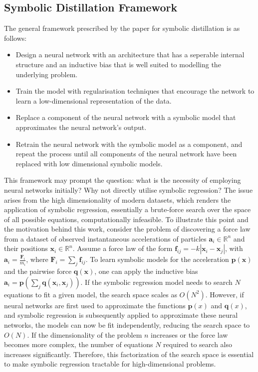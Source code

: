 \documentclass[11pt]{article}
\begin{document}
\subsection{Symbolic Distillation Framework}
The general framework prescribed by the paper for symbolic distillation is as follows:
\begin{itemize}
    \item Design a neural network with an architecture that has a seperable internal structure and an inductive bias that is well suited to modelling the underlying problem.
    \item Train the model with regularisation techniques that encourage the network to learn a low-dimensional representation of the data.
    \item Replace a component of the neural network with a symbolic model that approximates the neural network's output.
    \item Retrain the neural network with the symbolic model as a component, and repeat the process until all components of the neural network have been replaced with low dimensional symbolic models.
\end{itemize}

This framework may prompt the question: what is the necessity of employing neural networks initially? Why not directly utilise symbolic regression? The issue arises from the high dimensionality of modern datasets, which renders the application of symbolic regression, essentially a brute-force search over the space of all possible equations, computationally infeasible. To illustrate this point and the motivation behind this work, consider the problem of discovering a force law from a dataset of observed instantaneous accelerations of particles $\mathbf{a}_i \in \mathbb{R}^n$ and their positions $\mathbf{x}_i \in \mathbb{R}^n$. Assume a force law of the form $\mathbf{f}_{ij} = -k |\mathbf{x}_i - \mathbf{x}_j|$, with $\mathbf{a}_i = \frac{\mathbf{F}_i}{m_i}$, where $\mathbf{F}_i = \sum_j \mathbf{f}_{ij}$. To learn symbolic models for the acceleration $\textbf{p}(\textbf{x})$ and the pairwise force $\textbf{q}(\textbf{x})$, one can apply the inductive bias $\textbf{a}_i = \textbf{p}(\sum_j \textbf{q}(\textbf{x}_i, \textbf{x}_j))$. If the symbolic regression model needs to search $N$ equations to fit a given model, the search space scales as $O(N^2)$. However, if neural networks are first used to approximate the functions $\mathbf{p}(x)$ and $\mathbf{q}(x)$, and symbolic regression is subsequently applied to approximate these neural networks, the models can now be fit independently, reducing the search space to $O(N)$. If the dimensionality of the problem $n$ increases or the force law becomes more complex, the number of equations $N$ required to search also increases significantly. Therefore, this factorization of the search space is essential to make symbolic regression tractable for high-dimensional problems.
\end{document}
